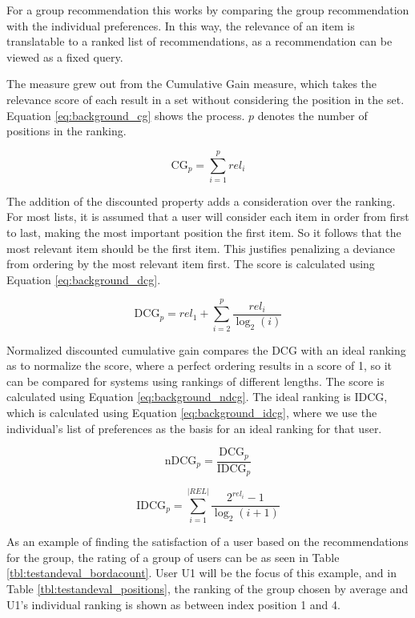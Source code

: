 For a group recommendation this works by comparing the group recommendation with the individual preferences. In this way, the relevance of an item is translatable to a ranked list of recommendations, as a recommendation can be viewed as a fixed query.

The measure grew out from the Cumulative Gain measure, which takes the relevance score of each result in a set without considering the position in the set. Equation \ref{eq:background_cg} shows the process. $p$ denotes the number of positions in the ranking.

\begin{equation}\label{eq:background_cg}
	\text{CG}_p = \sum_{i=1}^{p}\textit{rel}_i
\end{equation}

The addition of the discounted property adds a consideration over the ranking. For most lists, it is assumed that a user will consider each item in order from first to last, making the most important position the first item. So it follows that the most relevant item should be the first item. This justifies penalizing a deviance from ordering by the most relevant item first. The score is calculated using Equation \ref{eq:background_dcg}.

\begin{equation}\label{eq:background_dcg}
	\text{DCG}_p = \textit{rel}_1 + \sum_{i=2}^{p}\frac{\textit{rel}_i}{\log_2(i)}
\end{equation}

Normalized discounted cumulative gain compares the DCG with an ideal ranking as to normalize the score, where a perfect ordering results in a score of 1, so it can be compared for systems using rankings of different lengths. The score is calculated using Equation \ref{eq:background_ndcg}. The ideal ranking is IDCG, which is calculated using Equation \ref{eq:background_idcg}, where we use the individual's list of preferences as the basis for an ideal ranking for that user.

\begin{equation}\label{eq:background_ndcg}
	\text{nDCG}_p = \frac{\text{DCG}_p}{\text{IDCG}_p}
\end{equation}

\begin{equation}\label{eq:background_idcg}
	\text{IDCG}_p = \sum_{i=1}^{|REL|} \frac{2^{\textit{rel}_i}-1}{\log_2(i+1)}
\end{equation}

As an example of finding the satisfaction of a user based on the recommendations for the group, the rating of a group of users can be as seen in Table \ref{tbl:testandeval_bordacount}. User U1 will be the focus of this example, and in Table \ref{tbl:testandeval_positions}, the ranking of the group chosen by average and U1's individual ranking is shown as between index position 1 and 4.

